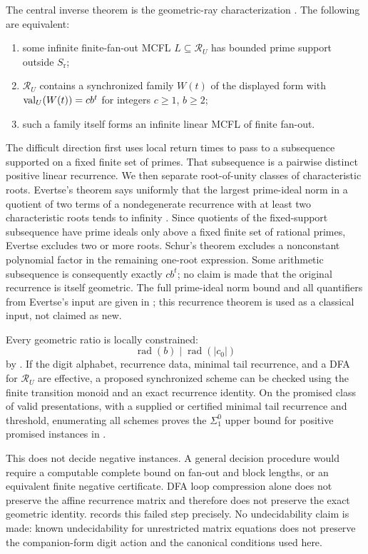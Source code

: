The central inverse theorem is the geometric-ray characterization
. The following are
equivalent:
\begin{enumerate}[label=\textup{(\roman*)}]
  \item some infinite finite-fan-out MCFL \(L\subseteq\mathcal R_U\)
    has bounded prime support outside \(S_{\mathrm r}\);
  \item \(\mathcal R_U\) contains a synchronized family \(W(t)\) of the
    displayed form with \(\operatorname{val}_U(W(t))=cb^t\) for integers \(c\ge1\),
    \(b\ge2\);
  \item such a family itself forms an infinite linear MCFL of finite
    fan-out.
\end{enumerate}
The difficult direction first uses local return times to pass to a
subsequence supported on a fixed finite set of primes. That subsequence is
a pairwise distinct positive linear recurrence. We then separate root-of-unity
classes of characteristic roots. Evertse's theorem says uniformly that the
largest prime-ideal norm in a quotient of two terms of a nondegenerate
recurrence with at least two characteristic roots tends to infinity
\cite[Theorem~3]{Evertse1984}. Since quotients of the fixed-support
subsequence have prime ideals only above a fixed finite set of rational
primes, Evertse excludes two or more roots. Schur's theorem excludes a
nonconstant polynomial factor in the remaining one-root expression. Some
arithmetic subsequence is consequently exactly \(cb^t\); no claim is made
that the original recurrence is itself geometric. The full
prime-ideal norm bound and all quantifiers from Evertse's input are given
in ; this recurrence theorem is
used as a classical input, not claimed as new.

Every geometric ratio is locally constrained:
\[
  \operatorname{rad}(b)\mid\operatorname{rad}(|c_0|)
\]
by . If the digit alphabet,
recurrence data, minimal tail recurrence, and a DFA for \(\mathcal R_U\)
are effective, a proposed synchronized scheme can be checked using the
finite transition monoid and an exact recurrence identity. On the promised
class of valid presentations, with a supplied or certified minimal tail
recurrence and threshold, enumerating all schemes proves the \(\Sigma^0_1\)
upper bound for positive promised instances in
.

This does not decide negative instances. A general decision procedure
would require a computable complete bound on fan-out and block lengths, or
an equivalent finite negative certificate. DFA loop compression alone does
not preserve the affine recurrence matrix and therefore does not preserve
the exact geometric identity. 
records this failed step precisely. No undecidability claim is made: known
undecidability for unrestricted matrix equations does not preserve the
companion-form digit action and the canonical conditions used here.

